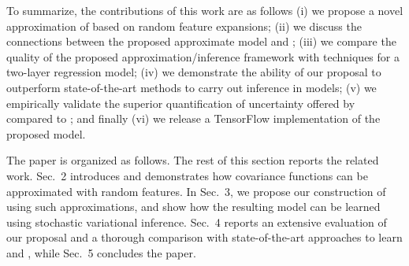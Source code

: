 
To summarize, the contributions of this work are as follows
(i) we propose a novel approximation of  based on random feature expansions;
(ii) we discuss the connections between the proposed approximate \dgp model and ;
(iii) we compare the quality of the proposed approximation/inference framework with \mcmc techniques for a two-layer \dgp regression model;
(iv) we demonstrate the ability of our proposal to outperform state-of-the-art methods to carry out inference in \dgp models;
(v) we empirically validate the superior quantification of uncertainty offered by  compared to ;
and finally (vi) we release a TensorFlow implementation of the proposed \dgp model.


The paper is organized as follows.
The rest of this section reports the related work.
Sec.~2 introduces  and demonstrates how covariance functions can be approximated with random features.
In Sec.~3, we propose our construction of  using such approximations, and show how the resulting model can be learned using stochastic variational inference. 
Sec.~4 reports an extensive evaluation of our proposal and a thorough comparison with state-of-the-art approaches to learn  and , while Sec.~5 concludes the paper.
